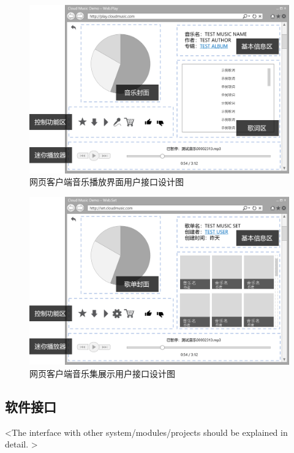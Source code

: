 \begin{figure}[h!]
  \centering
 
  \includegraphics[width=.95\linewidth]{figures/web_music}

  \caption{ \label{fig:web_music}
  		网页客户端音乐播放界面用户接口设计图
    }
\end{figure}

\begin{figure}[h!]
  \centering

  \includegraphics[width=.95\linewidth]{figures/web_collection}

  \caption{  \label{fig:web_collection}
  		网页客户端音乐集展示用户接口设计图
    }
\end{figure}



\subsection{软件接口}
<The interface with other system/modules/projects should be explained in detail. >

